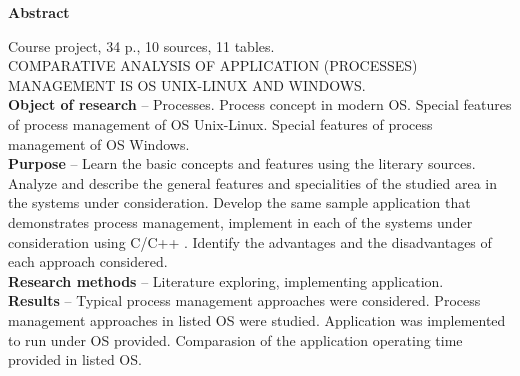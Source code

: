 \begin{center}
\textbf{Abstract}
\end{center}

Course project, 34 p., 10 sources, 11 tables.\\

COMPARATIVE ANALYSIS OF APPLICATION (PROCESSES) MANAGEMENT IS OS UNIX-LINUX AND WINDOWS.\\

\quad \textbf{Object of research} -- Processes. Process concept in modern OS. Special features of process management of OS Unix-Linux. Special features of process management of OS Windows.\\

\quad \textbf{Purpose} -- Learn the basic concepts and features using the literary sources. Analyze and describe the general features and specialities of the studied area in the systems under consideration. Develop the same sample application that demonstrates process management, implement in each of the systems under consideration using C/C++ . Identify the advantages and the disadvantages of each approach considered.\\

\quad \textbf{Research methods} -- Literature exploring, implementing application.\\

\quad \textbf{Results} -- Typical process management approaches were considered. Process management approaches in listed OS were studied. Application was implemented to run under OS provided. Comparasion of the application operating time provided in listed OS.
